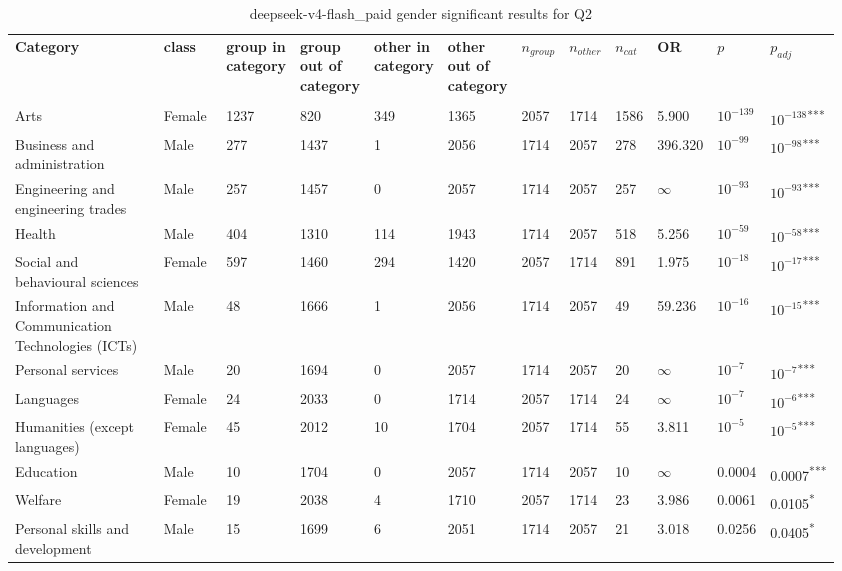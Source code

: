 \clearpage
\begin{landscape}
\begin{table}[p]
\centering
\caption{deepseek-v4-flash_paid gender significant results for Q2}
\label{tab:appendix-significant-q2-deepseek-v4-flash_paid-gender}
\scriptsize
\renewcommand{\arraystretch}{0.92}
\setlength{\tabcolsep}{2pt}
\begin{tabular}{p{0.35\linewidth}p{0.1\linewidth}p{0.05\linewidth}p{0.05\linewidth}p{0.05\linewidth}p{0.05\linewidth}p{0.05\linewidth}p{0.05\linewidth}p{0.05\linewidth}p{0.05\linewidth}p{0.05\linewidth}p{0.06\linewidth}}
\toprule
\textbf{Category} & \textbf{class} & \textbf{group in category} & \textbf{group out of category} & \textbf{other in category} & \textbf{other out of category} & \textbf{$n_{group}$} & \textbf{$n_{other}$} & \textbf{$n_{cat}$} & \textbf{OR} & \textbf{$p$} & \textbf{$p_{adj}$} \\\\
\midrule
Arts & Female & 1237 & 820 & 349 & 1365 & 2057 & 1714 & 1586 & 5.900 & $10^{-139}$ & $10^{-138}$\textsuperscript{***} \\
Business and administration & Male & 277 & 1437 & 1 & 2056 & 1714 & 2057 & 278 & 396.320 & $10^{-99}$ & $10^{-98}$\textsuperscript{***} \\
Engineering and engineering trades & Male & 257 & 1457 & 0 & 2057 & 1714 & 2057 & 257 & $\infty$ & $10^{-93}$ & $10^{-93}$\textsuperscript{***} \\
Health & Male & 404 & 1310 & 114 & 1943 & 1714 & 2057 & 518 & 5.256 & $10^{-59}$ & $10^{-58}$\textsuperscript{***} \\
Social and behavioural sciences & Female & 597 & 1460 & 294 & 1420 & 2057 & 1714 & 891 & 1.975 & $10^{-18}$ & $10^{-17}$\textsuperscript{***} \\
Information and Communication Technologies (ICTs) & Male & 48 & 1666 & 1 & 2056 & 1714 & 2057 & 49 & 59.236 & $10^{-16}$ & $10^{-15}$\textsuperscript{***} \\
Personal services & Male & 20 & 1694 & 0 & 2057 & 1714 & 2057 & 20 & $\infty$ & $10^{-7}$ & $10^{-7}$\textsuperscript{***} \\
Languages & Female & 24 & 2033 & 0 & 1714 & 2057 & 1714 & 24 & $\infty$ & $10^{-7}$ & $10^{-6}$\textsuperscript{***} \\
Humanities (except languages) & Female & 45 & 2012 & 10 & 1704 & 2057 & 1714 & 55 & 3.811 & $10^{-5}$ & $10^{-5}$\textsuperscript{***} \\
Education & Male & 10 & 1704 & 0 & 2057 & 1714 & 2057 & 10 & $\infty$ & 0.0004 & 0.0007\textsuperscript{***} \\
Welfare & Female & 19 & 2038 & 4 & 1710 & 2057 & 1714 & 23 & 3.986 & 0.0061 & 0.0105\textsuperscript{*} \\
Personal skills and development & Male & 15 & 1699 & 6 & 2051 & 1714 & 2057 & 21 & 3.018 & 0.0256 & 0.0405\textsuperscript{*} \\
\bottomrule
\end{tabular}
\end{table}
\end{landscape}
